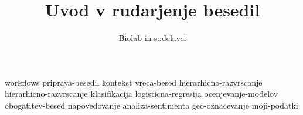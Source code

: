 \documentclass[symmetric, justified, a4paper]{tufte-book}
\title{Uvod v rudarjenje besedil}
\author[Biolab in sodelavci]{Biolab in sodelavci}
\begin{document}
\frontmatter

\maketitle



\tableofcontents

% 

\mainmatter



{workflows}
{priprava-besedil}
{kontekst}
{vreca-besed}
{hierarhicno-razvrscanje}
{hierarhicno-razvrscanje}
{klasifikacija}
{logisticna-regresija}
{ocenjevanje-modelov}
{obogatitev-besed}
{napovedovanje}
{analiza-sentimenta}
{geo-oznacevanje}
{moji-podatki}



\backmatter




\printindex
\end{document}

